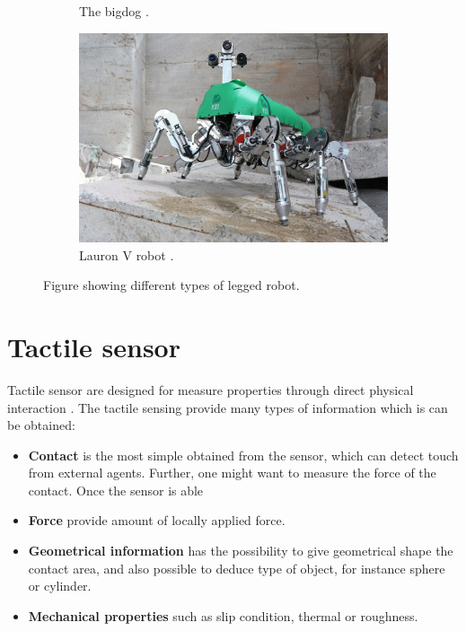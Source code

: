 \documentclass[USenglish]{ifimaster}  %
\begin{document}
\begin{figure}
\begin{subfigure}[b]{0.22\textwidth}
		\caption{The bigdog \cite{Raibert200810822}.}
		\label{fig:bigDog}
	\end{subfigure}\hfill
	\begin{subfigure}[b]{0.22\textwidth}
		\centering
		\includegraphics[width=\linewidth]{Figures/Lauron}
		\caption{Lauron V robot \cite{6878051}.}
		\label{fig:LAURON}
	\end{subfigure}
	\caption{Figure showing different types of legged robot.}\label{fig:robots}
\end{figure}

\FloatBarrier


\section{Tactile sensor}
Tactile sensor are designed for measure properties through direct physical interaction \cite{Cutkosky2008}. The tactile sensing provide many types of information which is can be obtained:

\begin{itemize}
	\item \textbf{Contact} is the most simple obtained from the sensor, which can detect touch from external agents. Further, one might want to measure the force of the contact. Once the sensor is able  
	\item \textbf{Force} provide amount of locally applied force.
	\item \textbf{Geometrical information} has the possibility to give geometrical shape the contact area, and also possible to deduce type of object, for instance sphere or cylinder.
	\item \textbf{Mechanical properties} such as slip condition, thermal or roughness.
\end{itemize}
\end{document}
